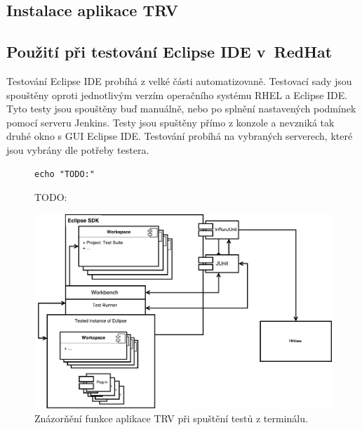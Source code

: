       \subsection{Instalace aplikace TRV}

    \subsection{Použití při testování Eclipse IDE v~RedHat}
    Testování Eclipse IDE probíhá z velké části automatizovaně. Testovací sady jsou spouštěny oproti jednotlivým verzím operačního systému RHEL a Eclipse IDE. Tyto testy jsou spouštěny buď manuálně, nebo po splnění nastavených podmínek pomocí serveru Jenkins. Testy jsou spuštěny přímo z konzole a nevzniká tak druhé okno s GUI Eclipse IDE. Testování probíhá na vybraných serverech, které jsou vybrány dle potřeby testera.
    
    \lstset{language=bash}
    \begin{figure}[h]
	  \begin{lstlisting}[frame=single]
echo "TODO:"
	  \end{lstlisting}
	  \caption{TODO:}
	  \label{code:syncExec}
	\end{figure}
    

    \begin{figure}[h]
	\includegraphics[width=\textwidth, center]{obrazky-figures/TRV_run_from_term.pdf}
	\caption{Znázorňění funkce aplikace TRV při spuštění testů z terminálu.}
	\label{fig:TRV_run_from_term}
      \end{figure}

